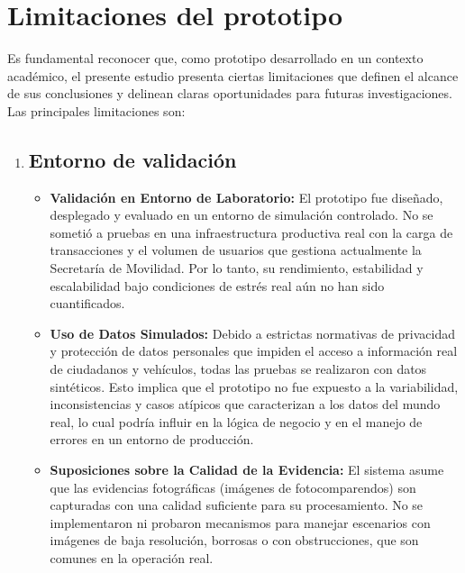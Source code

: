 \section{Limitaciones del prototipo}
Es fundamental reconocer que, como prototipo desarrollado en un contexto académico, el presente estudio presenta ciertas limitaciones que definen el alcance de sus conclusiones y delinean claras oportunidades para futuras investigaciones. Las principales limitaciones son:

\begin{enumerate}
    \item \subsection{Entorno de validación}
    \begin{itemize}
        \item \textbf{Validación en Entorno de Laboratorio:} El prototipo fue diseñado, desplegado y evaluado en un entorno de simulación controlado. No se sometió a pruebas en una infraestructura productiva real con la carga de transacciones y el volumen de usuarios que gestiona actualmente la Secretaría de Movilidad. Por lo tanto, su rendimiento, estabilidad y escalabilidad bajo condiciones de estrés real aún no han sido cuantificados.
        \item \textbf{Uso de Datos Simulados:} Debido a estrictas normativas de privacidad y protección de datos personales que impiden el acceso a información real de ciudadanos y vehículos, todas las pruebas se realizaron con datos sintéticos. Esto implica que el prototipo no fue expuesto a la variabilidad, inconsistencias y casos atípicos que caracterizan a los datos del mundo real, lo cual podría influir en la lógica de negocio y en el manejo de errores en un entorno de producción.
        \item \textbf{Suposiciones sobre la Calidad de la Evidencia:} El sistema asume que las evidencias fotográficas (imágenes de fotocomparendos) son capturadas con una calidad suficiente para su procesamiento. No se implementaron ni probaron mecanismos para manejar escenarios con imágenes de baja resolución, borrosas o con obstrucciones, que son comunes en la operación real.
    \end{itemize}


\end{enumerate}
